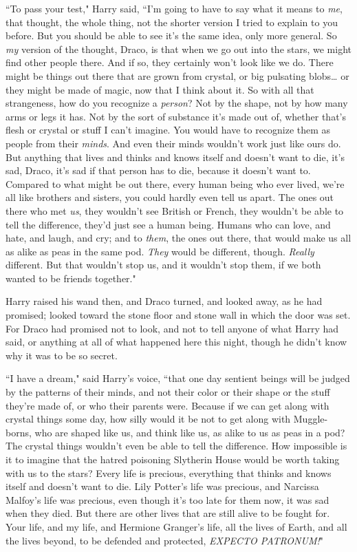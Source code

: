 ``To pass your test," Harry said, ``I'm going to have to say what it means to \emph{me}, that thought, the whole thing, not the shorter version I tried to explain to you before. But you should be able to see it's the same idea, only more general. So \emph{my} version of the thought, Draco, is that when we go out into the stars, we might find other people there. And if so, they certainly won't look like we do. There might be things out there that are grown from crystal, or big pulsating blobs{\ldots} or they might be made of magic, now that I think about it. So with all that strangeness, how do you recognize a \emph{person}? Not by the shape, not by how many arms or legs it has. Not by the sort of substance it's made out of, whether that's flesh or crystal or stuff I can't imagine. You would have to recognize them as people from their \emph{minds}. And even their minds wouldn't work just like ours do. But anything that lives and thinks and knows itself and doesn't want to die, it's sad, Draco, it's sad if that person has to die, because it doesn't want to. Compared to what might be out there, every human being who ever lived, we're all like brothers and sisters, you could hardly even tell us apart. The ones out there who met \emph{us}, they wouldn't see British or French, they wouldn't be able to tell the difference, they'd just see a human being. Humans who can love, and hate, and laugh, and cry; and to \emph{them}, the ones out there, that would make us all as alike as peas in the same pod. \emph{They} would be different, though. \emph{Really} different. But that wouldn't stop us, and it wouldn't stop them, if we both wanted to be friends together."

Harry raised his wand then, and Draco turned, and looked away, as he had promised; looked toward the stone floor and stone wall in which the door was set. For Draco had promised not to look, and not to tell anyone of what Harry had said, or anything at all of what happened here this night, though he didn't know why it was to be so secret.

``I have a dream," said Harry's voice, ``that one day sentient beings will be judged by the patterns of their minds, and not their color or their shape or the stuff they're made of, or who their parents were. Because if we can get along with crystal things some day, how silly would it be not to get along with Muggle-borns, who are shaped like us, and think like us, as alike to us as peas in a pod? The crystal things wouldn't even be able to tell the difference. How impossible is it to imagine that the hatred poisoning Slytherin House would be worth taking with us to the stars? Every life is precious, everything that thinks and knows itself and doesn't want to die. Lily Potter's life was precious, and Narcissa Malfoy's life was precious, even though it's too late for them now, it was sad when they died. But there are other lives that are still alive to be fought for. Your life, and my life, and Hermione Granger's life, all the lives of Earth, and all the lives beyond, to be defended and protected, \emph{EXPECTO PATRONUM!}"

